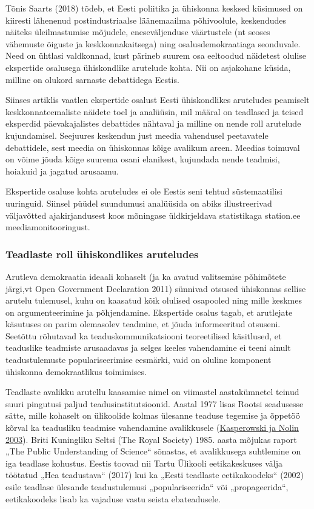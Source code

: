 \documentclass[estonian,]{article}
\begin{document}
Tõnis Saarts (2018) tõdeb, et Eesti poliitika ja ühiskonna kesksed küsimused on kiiresti lähenenud postindustriaalse läänemaailma põhivoolule, keskendudes näiteks üleilmastumise mõjudele, eneseväljenduse väärtustele (nt seoses vähemuste õiguste ja keskkonnakaitsega) ning osalusdemokraatiaga seonduvale. Need on ühtlasi valdkonnad, kust pärineb suurem osa eeltoodud näidetest olulise ekspertide osalusega ühiskondlike arutelude kohta. Nii on asjakohane küsida, milline on olukord sarnaste debattidega Eestis.

Siinses artiklis vaatlen ekspertide osalust Eesti ühiskondlikes aruteludes peamiselt keskkonnateemaliste näidete toel ja analüüsin, mil määral on teadlased ja teised eksperdid päevakajalistes debattides nähtaval ja milline on nende roll arutelude kujundamisel. Seejuures keskendun just meedia vahendusel peetavatele debattidele, sest meedia on ühiskonnas kõige avalikum areen. Meedias toimuval on võime jõuda kõige suurema osani elanikest, kujundada nende teadmisi, hoiakuid ja jagatud arusaamu.

Ekspertide osaluse kohta aruteludes ei ole Eestis seni tehtud süstemaatilisi uuringuid. Siinsel püüdel suundumusi analüüsida on abiks illustreerivad väljavõtted ajakirjandusest koos mõningase üldkirjeldava statistikaga station.ee meediamonitooringust.

\hypertarget{teadlaste-roll-uxfchiskondlikes-aruteludes}{%
\subsubsection*{Teadlaste roll ühiskondlikes aruteludes}\label{teadlaste-roll-uxfchiskondlikes-aruteludes}}

Arutleva demokraatia ideaali kohaselt (ja ka avatud valitsemise põhimõtete järgi,vt Open Government Declaration 2011) sünnivad otsused ühiskonnas sellise arutelu tulemusel, kuhu on kaasatud kõik olulised osapooled ning mille keskmes on argumenteerimine ja põhjendamine. Ekspertide osalus tagab, et arutlejate käsutuses on parim olemasolev teadmine, et jõuda informeeritud otsuseni. Seetõttu rõhutavad ka teaduskommunikatsiooni teoreetilised käsitlused, et teaduslike teadmiste arusaadavas ja selges keeles vahendamine ei teeni ainult teadustulemuste populariseerimise eesmärki, vaid on oluline komponent ühiskonna demokraatlikus toimimises.

Teadlaste avalikku arutellu kaasamise nimel on viimastel aastakümnetel teinud suuri pingutusi paljud teadusinstitutsioonid. Aastal 1977 lisas Rootsi seadusesse sätte, mille kohaselt on ülikoolide kolmas ülesanne teaduse tegemise ja õppetöö kõrval ka teadusliku teadmise vahendamine avalikkusele (\protect\hyperlink{Kasperowski2003}{Kasperowski ja Nolin 2003}). Briti Kuningliku Seltsi (The Royal Society) 1985. aasta mõjukas raport „The Public Understanding of Science`` sõnastas, et avalikkusega suhtlemine on iga teadlase kohustus. Eestis toovad nii Tartu Ülikooli eetikakeskuses välja töötatud „Hea teadustava`` (2017) kui ka „Eesti teadlaste eetikakoodeks`` (2002) esile teadlase ülesande teadustulemusi „populariseerida`` või „propageerida``, eetikakoodeks lisab ka vajaduse vastu seista ebateadusele.
\end{document}
